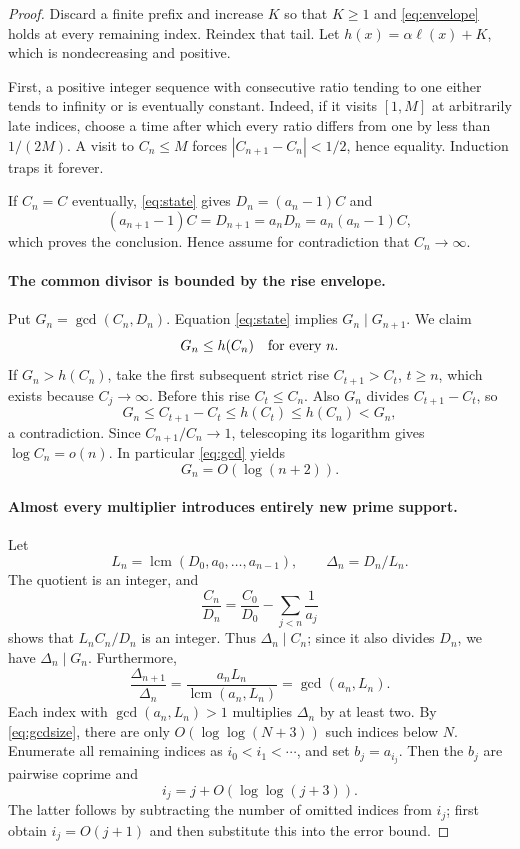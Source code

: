 \documentclass[11pt]{article}
\newcommand{\ellog}{\ell}
\begin{document}
\begin{proof}
Discard a finite prefix and increase $K$ so that $K\ge1$ and
\eqref{eq:envelope} holds at every remaining index. Reindex that tail.
Let $h(x)=\alpha\ellog(x)+K$, which is nondecreasing and positive.

First, a positive integer sequence with consecutive ratio tending to one
either tends to infinity or is eventually constant. Indeed, if it visits
$[1,M]$ at arbitrarily late indices, choose a time after which every ratio
differs from one by less than $1/(2M)$. A visit to $C_n\le M$ forces
$|C_{n+1}-C_n|<1/2$, hence equality. Induction traps it forever.

If $C_n=C$ eventually, \eqref{eq:state} gives $D_n=(a_n-1)C$ and
\[
 (a_{n+1}-1)C=D_{n+1}=a_nD_n=a_n(a_n-1)C,
\]
which proves the conclusion. Hence assume for contradiction that
$C_n\to\infty$.

\paragraph{The common divisor is bounded by the rise envelope.}
Put $G_n=\gcd(C_n,D_n)$. Equation \eqref{eq:state} implies
$G_n\mid G_{n+1}$. We claim
\begin{equation}\label{eq:gcd}
 G_n\le h(C_n)\quad\hbox{for every }n.
\end{equation}
If $G_n>h(C_n)$, take the first subsequent strict rise
$C_{t+1}>C_t$, $t\ge n$, which exists because $C_j\to\infty$.
Before this rise $C_t\le C_n$. Also $G_n$ divides
$C_{t+1}-C_t$, so
\[
 G_n\le C_{t+1}-C_t\le h(C_t)\le h(C_n)<G_n,
\]
a contradiction. Since $C_{n+1}/C_n\to1$, telescoping its logarithm
gives $\log C_n=o(n)$. In particular \eqref{eq:gcd} yields
\begin{equation}\label{eq:gcdsize}
 G_n=O(\log(n+2)).
\end{equation}

\paragraph{Almost every multiplier introduces entirely new prime support.}
Let
\[
 L_n=\operatorname{lcm}(D_0,a_0,\ldots,a_{n-1}),
 \qquad \Delta_n=D_n/L_n.
\]
The quotient is an integer, and
\[
 \frac{C_n}{D_n}=\frac{C_0}{D_0}-\sum_{j<n}\frac1{a_j}
\]
shows that $L_nC_n/D_n$ is an integer. Thus $\Delta_n\mid C_n$;
since it also divides $D_n$, we have $\Delta_n\mid G_n$.
Furthermore,
\begin{equation}\label{eq:reuse}
 \frac{\Delta_{n+1}}{\Delta_n}
 =\frac{a_nL_n}{\operatorname{lcm}(a_n,L_n)}
 =\gcd(a_n,L_n).
\end{equation}
Each index with $\gcd(a_n,L_n)>1$ multiplies $\Delta_n$ by at least two.
By \eqref{eq:gcdsize}, there are only $O(\log\log(N+3))$ such indices
below $N$. Enumerate all remaining indices as $i_0<i_1<\cdots$, and set
$b_j=a_{i_j}$. Then the $b_j$ are pairwise coprime and
\begin{equation}\label{eq:indices}
 i_j=j+O(\log\log(j+3)).
\end{equation}
The latter follows by subtracting the number of omitted indices from $i_j$;
first obtain $i_j=O(j+1)$ and then substitute this into the error bound.


\end{proof}
\end{document}
